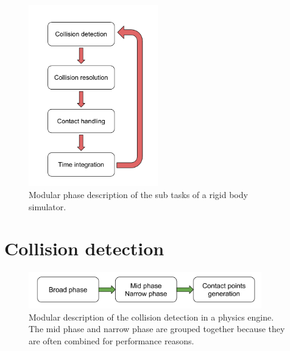 %

\begin{figure}[htp]
\center
\includegraphics[width=0.5\textwidth]{figures/star_simul_loop2}
\caption[Modular phase description of the sub tasks of a rigid body simulator]{Modular phase description of the sub tasks of a rigid body simulator.}
\label{fig:phase_simul}
\end{figure}

\section{Collision detection \label{sec:collision}}
\begin{figure}
\center
\includegraphics[width=0.9\textwidth]{figures/STAR_collision_v2}
\caption[Collision detection]{Modular description of the collision detection in a physics engine. The mid phase and narrow phase are grouped together because they are often combined for performance reasons.}
\label{fig:star_collision}
\end{figure}

